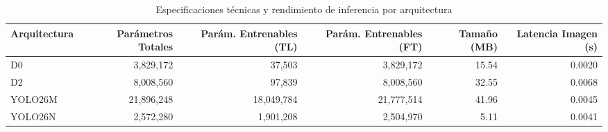 \begin{table}
\caption{Especificaciones técnicas y rendimiento de inferencia por arquitectura}
\label{tab:model_specs}
\begin{tabular}{lrrrrr}
\toprule
Arquitectura & Parámetros Totales & Parám. Entrenables (TL) & Parám. Entrenables (FT) & Tamaño (MB) & Latencia Imagen (s) \\
\midrule
D0 & 3,829,172 & 37,503 & 3,829,172 & 15.54 & 0.0020 \\
D2 & 8,008,560 & 97,839 & 8,008,560 & 32.55 & 0.0068 \\
YOLO26M & 21,896,248 & 18,049,784 & 21,777,514 & 41.96 & 0.0045 \\
YOLO26N & 2,572,280 & 1,901,208 & 2,504,970 & 5.11 & 0.0041 \\
\bottomrule
\end{tabular}
\end{table}
